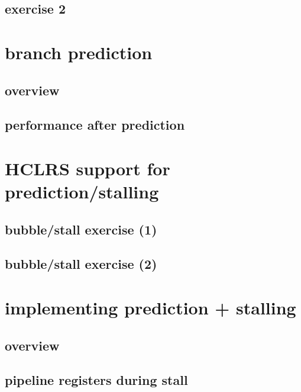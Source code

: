 \subsection{exercise 2}


\section{branch prediction}
\subsection{overview}


\subsection{performance after prediction}



\section{HCLRS support for prediction/stalling}




\subsection{bubble/stall exercise (1)}


\subsection{bubble/stall exercise (2)}


\section{implementing prediction + stalling}

\subsection{overview}


\subsection{pipeline registers during stall}


